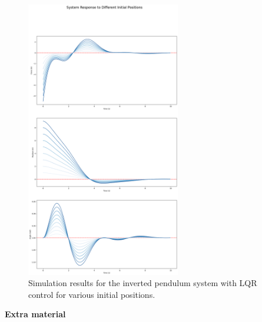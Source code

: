 \documentclass[a4 paper]{article}
\begin{document}
\begin{figure}[H]
    \centering
    \includegraphics[width=0.6\textwidth]{./figs/Different_initial_positions.png}
    \caption{Simulation results for the inverted pendulum system with LQR control for various initial positions.}
\end{figure}



    


\bigbreak
\bigbreak
\bigbreak
\bigbreak
\bigbreak
















\newpage
\textbf{\huge{Extra material}}
\end{document}
